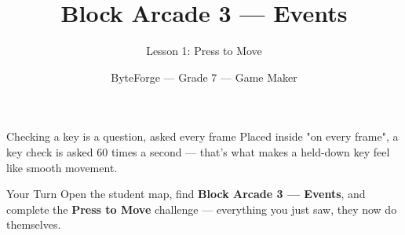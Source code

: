 \documentclass[aspectratio=169]{beamer}
\title{Block Arcade 3 — Events}
\subtitle{Lesson 1: Press to Move}
\author{ByteForge --- Grade 7 --- Game Maker}
\date{}
\begin{document}
\begin{frame}
    \titlepage
\end{frame}

\begin{frame}{Checking a key is a question, asked every frame}
    \Large
    Placed inside "on every frame", a key check is asked 60 times a second — that's what makes a held-down key feel like smooth movement.
\end{frame}

\begin{frame}{Your Turn}
    \Large
    Open the student map, find \textbf{Block Arcade 3 — Events}, and complete
    the \textbf{Press to Move} challenge --- everything you just saw, they now do themselves.
\end{frame}
\end{document}
